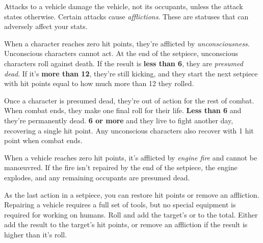 
Attacks to a vehicle damage the vehicle, not its occupants, unless the attack states otherwise. Certain attacks cause \emph{afflictions}. These are statuses that can adversely affect your stats.

When a character reaches zero hit points, they're afflicted by \emph{unconsciousness}. Unconscious characters cannot act. At the end of the setpiece, unconscious characters roll  against death. If the result is \textbf{less than 6}, they are \emph{presumed dead}. If it's \textbf{more than 12}, they're still kicking, and they start the next setpiece with hit points equal to how much more than 12 they rolled.

Once a character is presumed dead, they're out of action for the rest of combat. When combat ends, they make one final  roll for their life. \textbf{Less than 6} and they're permanently dead. \textbf{6 or more} and they live to fight another day, recovering a single hit point. Any unconscious characters also recover with 1 hit point when combat ends.

When a vehicle reaches zero hit points, it's afflicted by \emph{engine fire} and cannot be man\oe{}uvred. If the fire isn't repaired by the end of the setpiece, the engine explodes, and any remaining occupants are presumed dead.

As the last action in a setpiece, you can restore hit points or remove an affliction. Repairing a vehicle requires a full set of tools, but no special equipment is required for working on humans. Roll  and add the target's  or  to the total. Either add the result to the target's hit points, or remove an affliction if the result is higher than it's  roll.
